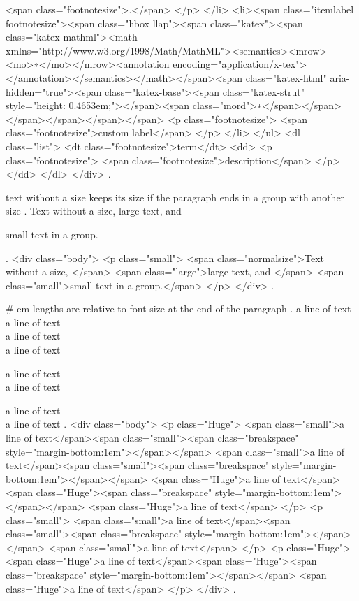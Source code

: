 <span class="footnotesize">.</span>
</p>
</li>
<li><span class="itemlabel footnotesize"><span class="hbox llap"><span class="katex"><span class="katex-mathml"><math xmlns="http://www.w3.org/1998/Math/MathML"><semantics><mrow><mo>∗</mo></mrow><annotation encoding="application/x-tex">\ast</annotation></semantics></math></span><span class="katex-html" aria-hidden="true"><span class="katex-base"><span class="katex-strut" style="height: 0.4653em;"></span><span class="mord">∗</span></span></span></span></span></span>
<p class="footnotesize">
<span class="footnotesize">custom label</span>
</p>
</li>
</ul>
<dl class="list">
<dt class="footnotesize">term</dt>
<dd>
<p class="footnotesize">
<span class="footnotesize">description</span>
</p>
</dd>
</dl>
</div>
.


text without a size keeps its size if the paragraph ends in a group with another size
.
Text without a size, \large large text, and {\small small text in a group.\par}
.
<div class="body">
<p class="small">
<span class="normalsize">Text without a size, </span>
<span class="large">large text, and </span>
<span class="small">small text in a group.</span>
</p>
</div>
.


#
em lengths are relative to font size at the end of the paragraph
.
\small
a line of text\\[1em]
a line of text\\[1em]
\Huge   %
a line of text\\[1em]
a line of text

\small
a line of text\\[1em]
a line of text

\Huge
a line of text\\[1em]
a line of text
.
<div class="body">
<p class="Huge">
<span class="small">a line of text</span><span class="small"><span class="breakspace" style="margin-bottom:1em"></span></span>
<span class="small">a line of text</span><span class="small"><span class="breakspace" style="margin-bottom:1em"></span></span>
<span class="Huge">a line of text</span><span class="Huge"><span class="breakspace" style="margin-bottom:1em"></span></span>
<span class="Huge">a line of text</span>
</p>
<p class="small">
<span class="small">a line of text</span><span class="small"><span class="breakspace" style="margin-bottom:1em"></span></span>
<span class="small">a line of text</span>
</p>
<p class="Huge">
<span class="Huge">a line of text</span><span class="Huge"><span class="breakspace" style="margin-bottom:1em"></span></span>
<span class="Huge">a line of text</span>
</p>
</div>
.


